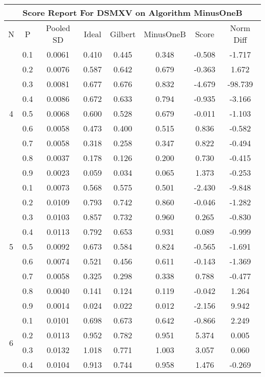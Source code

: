 \documentclass[11pt,a4paper]{report}
\begin{document}
\begin{longtable}{ | c | c || c | c | c | c | c | c | }
\hline
\multicolumn{8}{|c|}{ Score Report For DSMXV on Algorithm MinusOneB} \\
\hline
N & P & Pooled SD &  Ideal &  Gilbert & MinusOneB  & Score & Norm Diff \\
 \hline
 \hline
 \endhead
\multirow{9}{*}{4} & 0.1 & 0.0061 & 0.410 & 0.445 & 0.348 & -0.508 & -1.717 \\
 & 0.2 & 0.0076 & 0.587 & 0.642 & 0.679 & -0.363 & 1.672 \\
 & 0.3 & 0.0081 & 0.677 & 0.676 & 0.832 & -4.679 & -98.739 \\
 & 0.4 & 0.0086 & 0.672 & 0.633 & 0.794 & -0.935 & -3.166 \\
 & 0.5 & 0.0068 & 0.600 & 0.528 & 0.679 & -0.011 & -1.103 \\
 & 0.6 & 0.0058 & 0.473 & 0.400 & 0.515 & 0.836 & -0.582 \\
 & 0.7 & 0.0058 & 0.318 & 0.258 & 0.347 & 0.822 & -0.494 \\
 & 0.8 & 0.0037 & 0.178 & 0.126 & 0.200 & 0.730 & -0.415 \\
 & 0.9 & 0.0023 & 0.059 & 0.034 & 0.065 & 1.373 & -0.253 \\
 \hline
\multirow{9}{*}{5} & 0.1 & 0.0073 & 0.568 & 0.575 & 0.501 & -2.430 & -9.848 \\
 & 0.2 & 0.0109 & 0.793 & 0.742 & 0.860 & -0.046 & -1.282 \\
 & 0.3 & 0.0103 & 0.857 & 0.732 & 0.960 & 0.265 & -0.830 \\
 & 0.4 & 0.0113 & 0.792 & 0.653 & 0.931 & 0.089 & -0.999 \\
 & 0.5 & 0.0092 & 0.673 & 0.584 & 0.824 & -0.565 & -1.691 \\
 & 0.6 & 0.0074 & 0.521 & 0.456 & 0.611 & -0.143 & -1.369 \\
 & 0.7 & 0.0058 & 0.325 & 0.298 & 0.338 & 0.788 & -0.477 \\
 & 0.8 & 0.0040 & 0.141 & 0.124 & 0.119 & -0.042 & 1.264 \\
 & 0.9 & 0.0014 & 0.024 & 0.022 & 0.012 & -2.156 & 9.942 \\
 \hline
\multirow{9}{*}{6} & 0.1 & 0.0101 & 0.698 & 0.673 & 0.642 & -0.866 & 2.249 \\
 & 0.2 & 0.0113 & 0.952 & 0.782 & 0.951 & 5.374 & 0.005 \\
 & 0.3 & 0.0132 & 1.018 & 0.771 & 1.003 & 3.057 & 0.060 \\
 & 0.4 & 0.0104 & 0.913 & 0.744 & 0.958 & 1.476 & -0.269 \\

\end{longtable}
\end{document}
